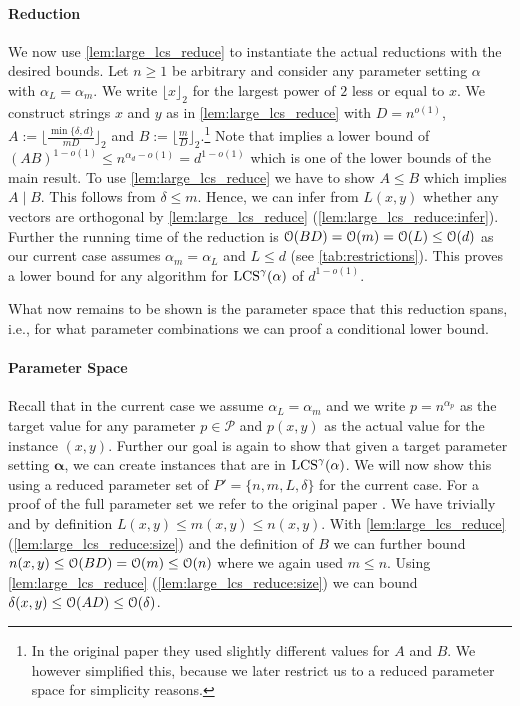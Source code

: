 \paragraph*{Reduction}
We now use \autoref{lem:large_lcs_reduce} to instantiate the actual reductions with the desired bounds.
Let $n \geq 1$ be arbitrary and consider any parameter setting $\alpha$ with $\alpha_L = \alpha_m$.
We write $\lfloor x \rfloor_2$ for the largest power of $2$ less or equal to $x$.
We construct strings $x$ and $y$ as in \autoref{lem:large_lcs_reduce} with $D = n^{o(1)}$, $A := \lfloor \frac{\min\{\delta, d\}}{mD} \rfloor_2$ and $B := \lfloor \frac{m}{D} \rfloor_2$.\footnote{In the original paper they used slightly different values for $A$ and $B$. We however simplified this, because we later restrict us to a reduced parameter space for simplicity reasons.}
Note that \uovh{} implies a lower bound of $(AB)^{1-o(1)} \leq n^{\alpha_d - o(1)} = d^{1 - o(1)}$ which is one of the lower bounds of the main result.
To use \autoref{lem:large_lcs_reduce} we have to show $A \leq B$ which implies $A \mid B$.
This follows from $\delta \leq m$.
Hence, we can infer from $L(x,y)$ whether any vectors are orthogonal by \autoref{lem:large_lcs_reduce} (\ref{lem:large_lcs_reduce:infer}).
Further the running time of the reduction is $\mathcal{O}(BD) = \mathcal{O}(m) = \mathcal{O}(L) \leq \mathcal{O}(d)$ as our current case assumes $\alpha_m = \alpha_L$ and $L \leq d$ (see \autoref{tab:restrictions}).
This proves a lower bound for any algorithm for $\text{LCS}^\gamma(\mathbb{\alpha})$ of $d^{1-o(1)}$.


What now remains to be shown is the parameter space that this reduction spans, i.e., for what \lcs{} parameter combinations we can proof a conditional lower bound.







\paragraph*{Parameter Space}
Recall that in the current case we assume $\alpha_L = \alpha_m$ and we write $p = n^{\alpha_p}$ as the target value for any parameter $p \in \mathcal{P}$ and $p(x,y)$ as the actual value for the \lcs{} instance $(x,y)$.
Further our goal is again to show that given a target parameter setting $\mathbf{\alpha}$, we can create instances that are in $\text{LCS}^\gamma(\mathbf{\alpha})$.
We will now show this using a reduced parameter set of $P' = \{n, m, L, \delta\}$ for the current case.
For a proof of the full parameter set we refer to the original paper \cite[section 9.2.2]{Bringman.2018}.
We have trivially and by definition $L(x,y) \leq m(x,y) \leq n(x,y)$.
With \autoref{lem:large_lcs_reduce} (\ref{lem:large_lcs_reduce:size}) and the definition of $B$ we can further bound $n(x,y) \leq \mathcal{O}(BD) = \mathcal{O}(m) \leq \mathcal{O}(n)$ where we again used $m \leq n$.
Using \autoref{lem:large_lcs_reduce} (\ref{lem:large_lcs_reduce:size}) we can bound $\delta(x,y) \leq \mathcal{O}(AD) \leq \mathcal{O}(\delta)$.

